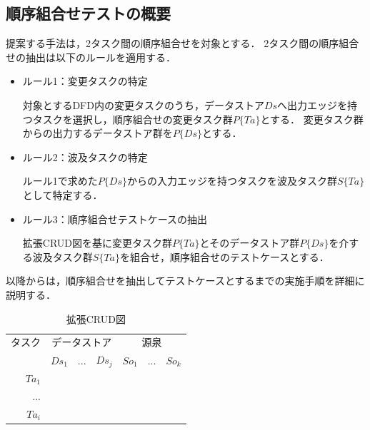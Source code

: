 \documentclass[a4paper,11pt]{jreport}
\begin{document}
\subsection{順序組合せテストの概要}
提案する手法は，2タスク間の順序組合せを対象とする．
2タスク間の順序組合せの抽出は以下のルールを適用する．
\begin{itemize}

\item ルール1：変更タスクの特定

対象とするDFD内の変更タスクのうち，データストア$Ds$へ出力エッジを持つタスクを選択し，順序組合せの変更タスク群$P\{Ta\}$とする．%
変更タスク群からの出力するデータストア群を$P\{Ds\}$とする．

\item ルール2：波及タスクの特定

ルール1で求めた$P\{Ds\}$からの入力エッジを持つタスクを波及タスク群$S\{Ta\}$として特定する．

\item ルール3：順序組合せテストケースの抽出

拡張CRUD図を基に変更タスク群$P\{Ta\}$とそのデータストア群$P\{Ds\}$を介する波及タスク群$S\{Ta\}$を組合せ，順序組合せのテストケースとする．
\end{itemize}

以降からは，順序組合せを抽出してテストケースとするまでの実施手順を詳細に説明する．

\begin{table}[t]
\caption{拡張CRUD図}
\label{CRUDIO}
\begin{center}
\begin{tabular}{r|r|r|r|r|r|r}
\multicolumn{1}{c|}{タスク} & \multicolumn{3}{c|}{データストア} & \multicolumn{3}{c}{源泉} \\
\cline{2-7}\multicolumn{1}{c|}{} & $Ds_1$ & $...$ & $Ds_j$ & $So_1$ & $...$ & $So_k$ \\
\hline
\hline
$Ta_1$ &   &   &   &   &   &  \\
\hline
$...$ &   &   &   &   &   &  \\
\hline
$Ta_i$ &   &   &   &   &   &  \\
    \hline
\end{tabular}%
\end{center}
\end{table}
\end{document}
